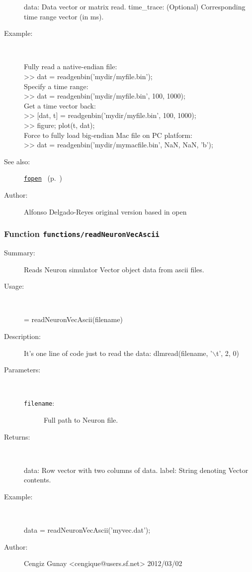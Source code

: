\begin{description}
   data: Data vector or matrix read.
   time\_trace: (Optional) Corresponding time range vector (in ms).
%
\item[Example:]~
\begin{lyxcode} Fully read a native-endian file:
\\%
 >> dat = readgenbin('mydir/myfile.bin');
\\%
 Specify a time range:
\\%
 >> dat = readgenbin('mydir/myfile.bin', 100, 1000);
\\%
 Get a time vector back:
\\%
 >> [dat, t] = readgenbin('mydir/myfile.bin', 100, 1000);
\\%
 >> figure; plot(t, dat);
\\%
 Force to fully load big-endian Mac file on PC platform:
\\%
 >> dat = readgenbin('mydir/mymacfile.bin', NaN, NaN, 'b');
\\%
\end{lyxcode}
%
\item[See also:]%
\hyperlink{ref_fopen}{\texttt{fopen}}%
\ (p.~\pageref{ref_fopen})%
%
%
\item[Author:]%
Alfonso Delgado-Reyes original version based in open
%
\end{description}
\methodline%
\subsubsection[Function \texttt{readNeuronVecAscii}]{Function \texttt{functions/readNeuronVecAscii}}%
%
\label{ref_functions__readNeuronVecAscii}%
\hypertarget{ref_functions__readNeuronVecAscii}{}%
\begin{description}
\item[Summary:]Reads Neuron simulator Vector object data from ascii files.
%
\item[Usage:]~%
\begin{lyxcode}%
[data, label] = readNeuronVecAscii(filename) 
%
\end{lyxcode}%
%
\item[Description:]%
It's one line of code just to read the data: dlmread(filename, '$\backslash$t', 2, 0)
\item[Parameters:]~
\begin{description}%
\item[\texttt{filename}:]
 Full path to Neuron file.
\end{description}%
%
\item[Returns:
]~

   data: Row vector with two columns of data.
   label: String denoting Vector contents.
%
\item[Example:]~
\begin{lyxcode}   data = readNeuronVecAscii('myvec.dat');
\\%
\end{lyxcode}
%
%
\item[Author:]%
Cengiz Gunay <cengique@users.sf.net> 2012/03/02
%
\end{description}
\methodline%
